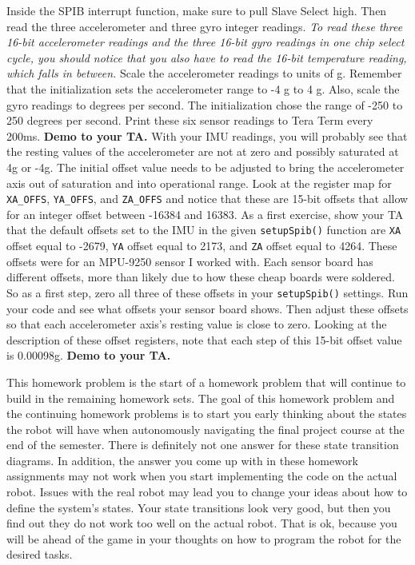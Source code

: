 \documentclass[11pt]{article}
\begin{document}
Inside the SPIB interrupt function, make sure to pull Slave Select high. Then read the three accelerometer and three gyro integer readings. \textit{To read these three 16-bit accelerometer readings and the three 16-bit gyro readings in one chip select cycle, you should notice that you also have to read the 16-bit temperature reading, which falls in between.}  Scale the accelerometer readings to units of g. Remember that the initialization sets the accelerometer range to -4 g to 4 g. Also, scale the gyro readings to degrees per second. The initialization chose the range of -250 to 250 degrees per second. Print these six sensor readings to Tera Term every 200ms. \textbf{Demo to your TA.}  With your IMU readings, you will probably see that the resting values of the accelerometer are not at zero and possibly saturated at 4g or -4g. The initial offset value needs to be adjusted to bring the accelerometer axis out of saturation and into operational range. Look at the register map for \texttt{XA_OFFS}, \texttt{YA_OFFS}, and \texttt{ZA_OFFS} and notice that these are 15-bit offsets that allow for an integer offset between -16384 and 16383. As a first exercise, show your TA that the default offsets set to the IMU in the given \texttt{setupSpib()} function are \texttt{XA} offset equal to         -2679, \texttt{YA} offset equal to 2173, and \texttt{ZA} offset equal to 4264. These offsets were for an MPU-9250 sensor I worked with. Each sensor board has different offsets, more than likely due to how these cheap boards were soldered. So as a first step, zero all three of these offsets in your \texttt{setupSpib()} settings. Run your code and see what offsets your sensor board shows. Then adjust these offsets so that each accelerometer axis's resting value is close to zero. Looking at the description of these offset registers, note that each step of this 15-bit offset value is 0.00098g. \textbf{Demo to your TA.}


This homework problem is the start of a homework problem that will continue to build in the remaining homework sets. The goal of this homework problem and the continuing homework problems is to start you early thinking about the states the robot will have when autonomously navigating the final project course at the end of the semester. There is definitely not one answer for these state transition diagrams. In addition, the answer you come up with in these homework assignments may not work when you start implementing the code on the actual robot. Issues with the real robot may lead you to change your ideas about how to define the system's states. Your state transitions look very good, but then you find out they do not work too well on the actual robot. That is ok, because you will be ahead of the game in your thoughts on how to program the robot for the desired tasks.
\end{document}
